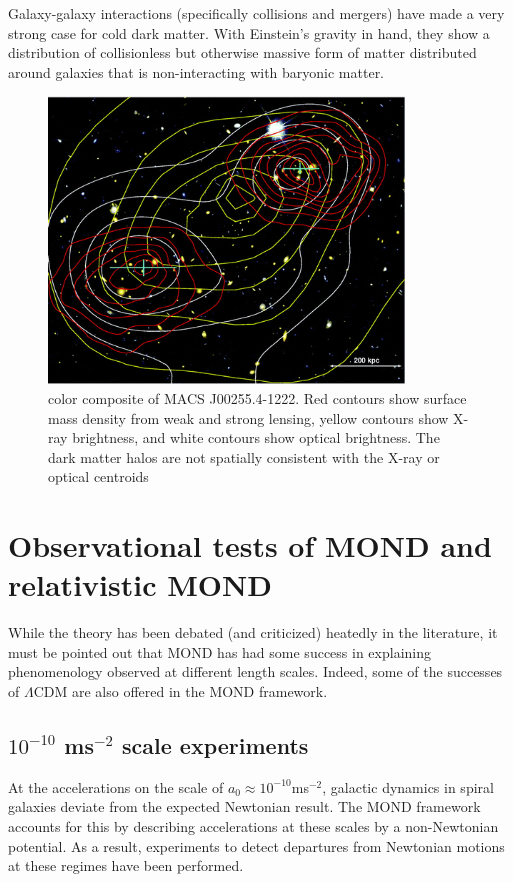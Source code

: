 \documentclass[12pt]{article}
\begin{document}
Galaxy-galaxy interactions (specifically collisions and mergers) have made a very strong case for cold dark matter. With Einstein's gravity in hand, they show a distribution of collisionless but otherwise massive form of matter distributed around galaxies that is non-interacting with baryonic matter.  
\begin{figure}
\centering
\includegraphics[height=3in]{marushaCluster.png}
\caption{color composite of MACS J00255.4-1222. Red contours show surface mass density from weak and strong lensing, yellow contours show X-ray brightness, and white contours show optical brightness. The dark matter halos are not spatially consistent with the X-ray or optical centroids\cite{Bradec2008}}
\end{figure}

\section{Observational tests of MOND and relativistic MOND}
While the theory has been debated (and criticized) heatedly in the literature, it must be pointed out that MOND has had some success in explaining phenomenology observed at different length scales. Indeed, some of the successes of $\Lambda$CDM are also offered in the MOND framework.  

\subsection{$ 10^{-10}$ ms$^{-2}$ scale experiments}
At the accelerations on the scale of $a_{0} \approx 10^{-10}$ms$^{-2}$, galactic dynamics in spiral galaxies deviate from the expected Newtonian result. The MOND framework accounts for this by describing accelerations at these scales by a non-Newtonian potential. As a result, experiments to detect departures from Newtonian motions at these regimes have been performed.
\end{document}
